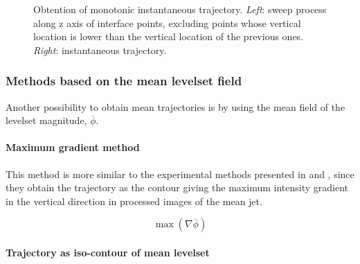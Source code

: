 \begin{figure}[ht]
     \centering
     \begin{subfigure}[b]{0.45\textwidth}
         \centering
     \end{subfigure}
     \begin{subfigure}[b]{0.45\textwidth}
         \centering
     \end{subfigure}
        \caption{Obtention of monotonic instantaneous trajectory. \textsl{Left}: sweep process along z axis of interface points, excluding points whose vertical location is lower than the vertical location of the previous ones. \textsl{Right}: instantaneous trajectory.}
        \label{fig:trajectory_obtention_instantaneous_method_b}
\end{figure}


\subsubsection{Methods based on the mean levelset field}

Another possibility to obtain mean trajectories is by using the mean field of the levelset magnitude, $\overline{\phi}$. 

\paragraph{Maximum gradient method}

This method is more similar to the experimental methods presented in  and , since they obtain the trajectory as the contour giving the maximum intensity gradient in the vertical direction in processed images of the mean jet.

\begin{equation}
\max \left( \nabla \overline{\phi} \right)
\end{equation}

\paragraph{Trajectory as iso-contour of mean levelset}



